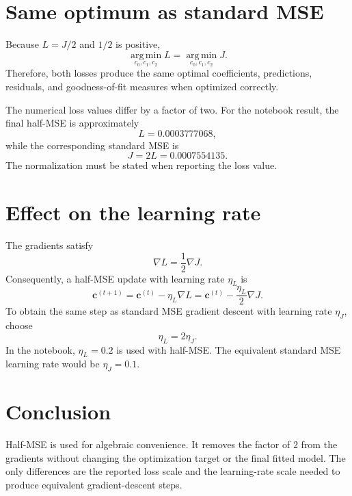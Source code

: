 \documentclass[11pt]{article}
\begin{document}
\section{Same optimum as standard MSE}

Because $L = J/2$ and $1/2$ is positive,
\[
\operatorname*{arg\,min}_{c_0,c_1,c_2} L
= \operatorname*{arg\,min}_{c_0,c_1,c_2} J.
\]
Therefore, both losses produce the same optimal coefficients, predictions,
residuals, and goodness-of-fit measures when optimized correctly.

The numerical loss values differ by a factor of two. For the notebook result,
the final half-MSE is approximately
\[
L = 0.0003777068,
\]
while the corresponding standard MSE is
\[
J = 2L = 0.0007554135.
\]
The normalization must be stated when reporting the loss value.

\section{Effect on the learning rate}

The gradients satisfy
\[
\nabla L = \frac{1}{2}\nabla J.
\]
Consequently, a half-MSE update with learning rate $\eta_L$ is
\[
\boldsymbol{c}^{(t+1)}
= \boldsymbol{c}^{(t)} - \eta_L\nabla L
= \boldsymbol{c}^{(t)} - \frac{\eta_L}{2}\nabla J.
\]
To obtain the same step as standard MSE gradient descent with learning rate
$\eta_J$, choose
\[
\eta_L = 2\eta_J.
\]
In the notebook, $\eta_L=0.2$ is used with half-MSE. The equivalent standard
MSE learning rate would be $\eta_J=0.1$.

\section{Conclusion}

Half-MSE is used for algebraic convenience. It removes the factor of $2$ from
the gradients without changing the optimization target or the final fitted
model. The only differences are the reported loss scale and the learning-rate
scale needed to produce equivalent gradient-descent steps.
\end{document}
